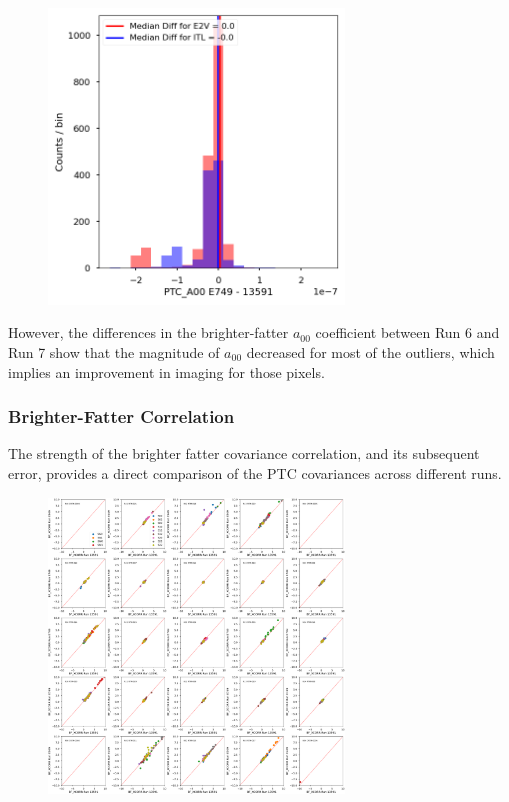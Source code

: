 \begin{figure}[H]
\begin{centering}
\includegraphics[width=0.7\textwidth]{figures/baselineCharacterization/PTC_A00_13591_E749_diff.png}
\end{centering}
\end{figure}

However, the differences in the brighter-fatter $a_{00}$ coefficient between Run 6 and
Run 7 show that the magnitude of $a_{00}$ decreased for most
of the outliers, which implies an improvement in imaging for those pixels.

\subsubsection{Brighter-Fatter Correlation}\label{brighter-fatter-correlation}

The strength of the brighter fatter covariance correlation, and its subsequent error, provides a direct comparison of the PTC covariances across different runs.

\begin{figure}[H]
\begin{centering}
\includegraphics[width=0.7\textwidth]{figures/baselineCharacterization/13591_E749_BF_XCORR.png}
\end{centering}
\end{figure}

